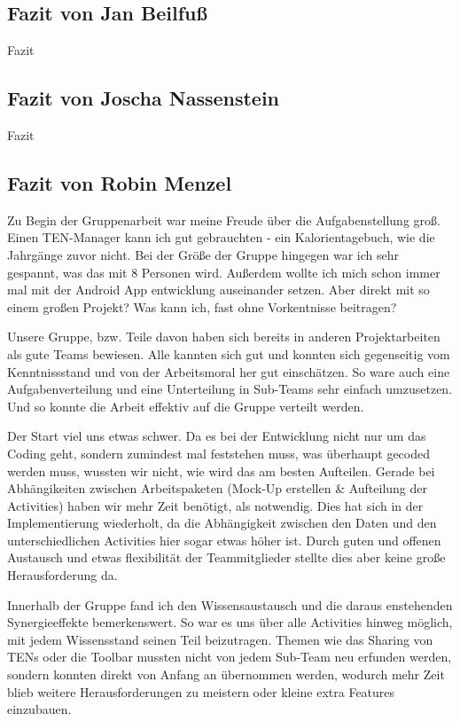 \subsection{Fazit von Jan Beilfuß}

Fazit

\subsection{Fazit von Joscha Nassenstein}

Fazit

\subsection{Fazit von Robin Menzel}

Zu Begin der Gruppenarbeit war meine Freude über die Aufgabenstellung groß. Einen TEN-Manager kann ich gut gebrauchten - ein Kalorientagebuch, wie die Jahrgänge zuvor nicht. Bei der Größe der Gruppe hingegen war ich sehr gespannt, was das mit 8 Personen wird. Außerdem wollte ich mich schon immer mal mit der Android App entwicklung auseinander setzen. Aber direkt mit so einem großen Projekt? Was kann ich, fast ohne Vorkentnisse beitragen?

Unsere Gruppe, bzw. Teile davon haben sich bereits in anderen Projektarbeiten als gute Teams bewiesen. Alle kannten sich gut und konnten sich gegenseitig vom Kenntnissstand und von der Arbeitsmoral her gut einschätzen. So ware auch eine Aufgabenverteilung und eine Unterteilung in Sub-Teams sehr einfach umzusetzen. Und so konnte die Arbeit effektiv auf die Gruppe verteilt werden.

Der Start viel uns etwas schwer. Da es bei der Entwicklung nicht nur um das Coding geht, sondern zumindest mal feststehen muss, was überhaupt gecoded werden muss, wussten wir nicht, wie wird das am besten Aufteilen. Gerade bei Abhängikeiten zwischen Arbeitspaketen (Mock-Up erstellen \& Aufteilung der Activities) haben wir mehr Zeit benötigt, als notwendig. Dies hat sich in der Implementierung wiederholt, da die Abhängigkeit zwischen den Daten und den unterschiedlichen Activities hier sogar etwas höher ist. Durch guten und offenen Austausch und etwas flexibilität der Teammitglieder stellte dies aber keine große Herausforderung da.

Innerhalb der Gruppe fand ich den Wissensaustausch und die daraus enstehenden Synergieeffekte bemerkenswert. So war es uns über alle Activities hinweg möglich, mit jedem Wissensstand seinen Teil beizutragen. Themen wie das Sharing von TENs oder die Toolbar mussten nicht von jedem Sub-Team neu erfunden werden, sondern konnten direkt von Anfang an übernommen werden, wodurch mehr Zeit blieb weitere Herausforderungen zu meistern oder kleine extra Features einzubauen.

